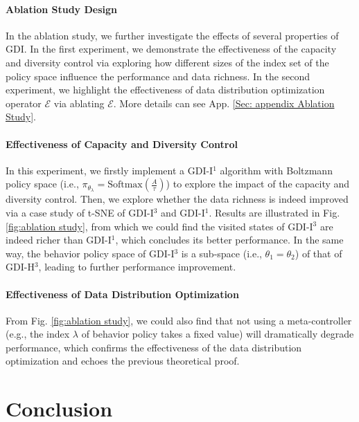 \documentclass[nohyperref]{article}
\newcommand{\changnan}[1]{{\color{red}{\small\bf\sf [changnan: #1]}}}
\theoremstyle{plain}
\begin{document}
\paragraph{Ablation Study Design} In the ablation study, we further investigate the effects of several properties of GDI. In the first experiment, we demonstrate the effectiveness of the capacity and diversity control via exploring how different sizes  of the index set of the policy space influence the performance and data richness. In the second experiment, we highlight the effectiveness of data distribution optimization operator $\mathcal{E}$ via ablating $\mathcal{E}$. More details can see App. \ref{Sec: appendix Ablation Study}.
 

\paragraph{Effectiveness of Capacity and Diversity Control}

In this experiment, we firstly implement a GDI-I$^1$ algorithm with Boltzmann policy space (i.e., $\pi_{\theta_{\lambda}}=\text{Softmax}(\frac{A}{\tau})$) to explore the impact of the  capacity and diversity control. Then, we explore whether the data richness is indeed improved via a case study of t-SNE of GDI-I$^3$ and GDI-I$^1$. Results are illustrated in Fig. \ref{fig:ablation study}, from which we could find the visited states of GDI-I$^3$ are indeed  richer than GDI-I$^1$, which concludes its better performance. In the same way, the behavior policy space of GDI-I$^3$ is a sub-space (i.e., $\theta_1=\theta_2$) of that of GDI-H$^3$, leading to further performance improvement.

\paragraph{Effectiveness of  Data Distribution Optimization} 
From  Fig. \ref{fig:ablation study}, we could also find that not using a meta-controller (e.g., the index $\lambda$ of behavior policy takes a fixed value) will  dramatically degrade performance, which confirms the effectiveness of the data distribution optimization and echoes the previous theoretical proof.

\section{Conclusion}
\end{document}
